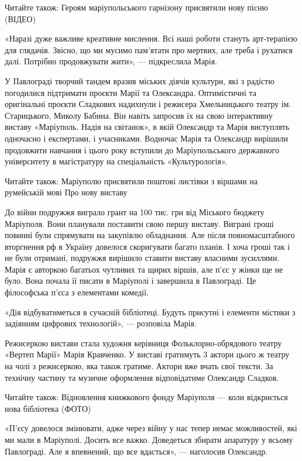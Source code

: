 Читайте також: Героям маріупольського гарнізону присвятили нову пісню (ВІДЕО)

«Наразі дуже важливе креативне мислення. Всі наші роботи стануть арт-терапією
для глядачів. Звісно, що ми мусимо пам'ятати про мертвих, але треба і рухатися
далі. Потрібно продовжувати жити», — підкреслила Марія. 

У Павлограді творчий тандем вразив міських діячів культури, які з радістю
погодилися підтримати проєкти Марії та Олександра. Оптимістичні та оригінальні
проєкти Сладкових надихнули і режисера Хмельницького театру ім. Старицького,
Миколу Бабина. Він навіть запросив їх на свою інтерактивну виставу «Маріуполь.
Надія на світанок», в якій Олександр та Марія виступлять одночасно і
експертами, і учасниками. Водночас Марія та Олександр вирішили продовжити
навчання і цього року вступили до Маріупольського державного університету в
магістратуру на спеціальність «Культурологія».

Читайте також: Маріуполю присвятили поштові листівки з віршами на румейській
мові Про нову виставу

До війни подружжя виграло грант на 100 тис. грн від Міського бюджету Маріуполя.
Вони планували поставити свою першу виставу. Виграні гроші повинні були
спрямувати на закупівлю обладнання. Але після повномасштабного вторгнення рф в
Україну довелося скоригувати багато планів. І хоча гроші так і не були
отримані, подружжя вирішило ставити виставу власними зусиллями. Марія є
авторкою багатьох чутливих та щирих віршів, але п'єс у жінки ще не було. Вона
почала її писати в Маріуполі і завершила в Павлограді. Це філософська п'єса з
елементами комедії. 

«Дія відбуватиметься в сучасній бібліотеці. Будуть присутні і елементи містики
з задіянням цифрових технологій», — розповіла Марія.

Режисеркою вистави стала художня керівниця Фольклорно-обрядового театру «Вертеп
Марії» Марія Кравченко. У виставі гратимуть 3 актори цього ж театру на чолі з
режисеркою, яка також гратиме. Актори вже вчать свої тексти. За технічну
частину та музичне оформлення відповідатиме Олександр Сладков. 

Читайте також: Відновлення книжкового фонду Маріуполя — коли відкриється нова
бібліотека (ФОТО)

«П'єсу довелося змінювати, адже через війну у нас тепер немає можливостей, які
ми мали в Маріуполі. Досить все важко. Доведеться збирати апаратуру у всьому
Павлограді. Але я впевнений, що все вдасться», — наголосив Олександр.

